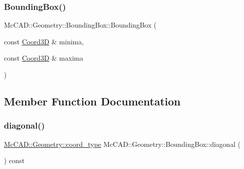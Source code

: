 \mbox{\label{classMcCAD_1_1Geometry_1_1BoundingBox_a7ed4eaad9315ad7414c2518ef49e2af5}} 
\subsubsection{\texorpdfstring{Bounding\+Box()}{BoundingBox()}\hspace{0.1cm}{\footnotesize\ttfamily [4/4]}}
{\footnotesize\ttfamily Mc\+C\+A\+D\+::\+Geometry\+::\+Bounding\+Box\+::\+Bounding\+Box (\begin{DoxyParamCaption}\item[{const \hyperlink{classMcCAD_1_1Geometry_1_1Coord3D}{Coord3D} \&}]{minima,  }\item[{const \hyperlink{classMcCAD_1_1Geometry_1_1Coord3D}{Coord3D} \&}]{maxima }\end{DoxyParamCaption})}



\subsection{Member Function Documentation}
\mbox{\label{classMcCAD_1_1Geometry_1_1BoundingBox_afe4d5ffa8973b4db685b7e50fbbd4cea}} 
\subsubsection{\texorpdfstring{diagonal()}{diagonal()}\hspace{0.1cm}{\footnotesize\ttfamily [1/2]}}
{\footnotesize\ttfamily \hyperlink{namespaceMcCAD_1_1Geometry_ac043b37a4a7e849fca22869e1982d2f8}{Mc\+C\+A\+D\+::\+Geometry\+::coord\+\_\+type} Mc\+C\+A\+D\+::\+Geometry\+::\+Bounding\+Box\+::diagonal (\begin{DoxyParamCaption}{ }\end{DoxyParamCaption}) const}



